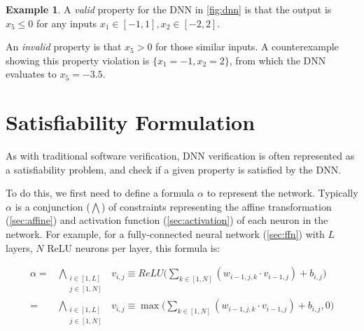 \documentclass[oneside,11pt,dvipsnames]{book}
\numberwithin{equation}{section}
\theoremstyle{definition}
\newtheorem{example}{Example}[section]
\theoremstyle{remark}
\begin{document}




\begin{example}\label{ex:dnn}
A \emph{valid} property for the DNN in \autoref{fig:dnn} is that the output is $x_5 \le 0$ for any inputs $x_1 \in [-1,1], x_2\in[-2,2]$. 

An \emph{invalid} property is that $x_5 > 0$ for those similar inputs.
A counterexample showing this property violation is $\{x_1=-1, x_2=2\}$, from which the DNN evaluates to $x_5=-3.5$. 
\end{example}



\section{Satisfiability Formulation}\label{sec:satisfiability-and-activation-pattern-search}

As with traditional software verification, DNN verification is often represented as a satisfiability problem, and check if a given property is satisfied by the DNN. 

To do this, we first need to define a formula $\alpha$ to represent the network. Typically $\alpha$ is a conjunction ($\bigwedge$) of constraints representing the affine transformation (\autoref{sec:affine}) and activation function (\autoref{sec:activation}) of each neuron in the network.
For example, for a fully-connected neural network (\autoref{sec:ffn}) with $L$ layers, $N$ ReLU neurons per layer, this formula is:

\begin{align*}
\alpha = &\bigwedge_{\begin{smallmatrix}i \in [1,L]\\ j \in [1,N]\end{smallmatrix}}~~v_{i,j} \equiv ReLU \Big( \sum_{k \in [1,N]} (w_{i-1,j,k} \cdot v_{i-1,j}) + b_{i,j}\Big)    \\
 = &\bigwedge_{\begin{smallmatrix}i \in [1,L]\\ j \in [1,N]\end{smallmatrix}}~~v_{i,j} \equiv \max \Big( \sum_{k \in [1,N]} (w_{i-1,j,k} \cdot v_{i-1,j}) + b_{i,j}, 0 \Big)
\end{align*}
\end{document}
